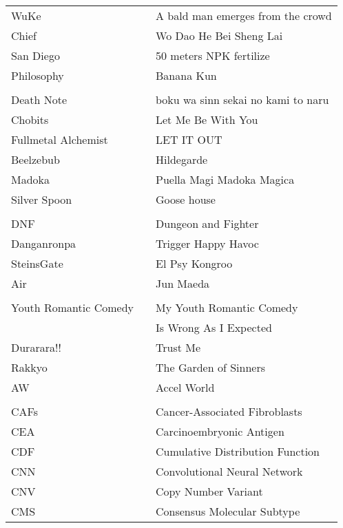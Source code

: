 
\begin{abbreviations}
\begin{longtable}{@{\extracolsep{\fill}}lll@{}}
WuKe & \hspace{4em} & A bald man emerges from the crowd \\
Chief & & Wo Dao He Bei Sheng Lai \\
San Diego & &  50 meters NPK fertilize \\
Philosophy & & Banana Kun \\ %
 & &  \\
Death Note & & boku wa sinn sekai no kami to naru\\
Chobits & & Let Me Be With You \\
Fullmetal Alchemist & & LET IT OUT \\
Beelzebub & & Hildegarde \\
Madoka & & Puella Magi Madoka Magica \\
Silver Spoon & & Goose house \\
& &  \\
DNF & & Dungeon and Fighter \\
Danganronpa & & Trigger Happy Havoc \\
SteinsGate & & El Psy Kongroo \\
Air & & Jun Maeda \\
& &  \\
Youth Romantic Comedy & & My Youth Romantic Comedy \\
& & Is Wrong As I Expected \\
Durarara!! & & Trust Me \\
Rakkyo & & The Garden of Sinners \\
AW & & Accel World \\
& &  \\
CAFs & & Cancer-Associated Fibroblasts \\
CEA & & Carcinoembryonic Antigen \\
CDF & & Cumulative Distribution Function \\
CNN & & Convolutional Neural Network \\
CNV & & Copy Number Variant \\
CMS & &  Consensus Molecular Subtype \\

\end{longtable}
\end{abbreviations}
